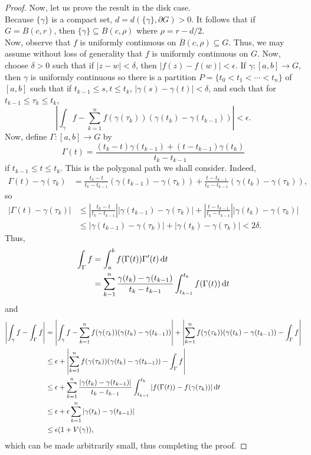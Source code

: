 \begin{proof}
		Now, let us prove the result in the disk case.\\
		Because $\{\gamma\}$ is a compact set, $d = d(\{\gamma\},\partial G) > 0$. It follows that if $G = B(c,r)$, then $\{\gamma\} \subseteq B(c,\rho)$ where $\rho = r - d/2$.\\
		Now, observe that $f$ is uniformly continuous on $\overline{B}(c,\rho) \subseteq G$. Thus, we may assume without loss of generality that $f$ is uniformly continuous on $G$. Now, choose $\delta > 0$ such that if $|z-w| < \delta$, then $|f(z) - f(w)| < \epsilon$. If $\gamma : [a,b] \to G$, then $\gamma$ is uniformly continuous so there is a partition $P = \{t_0 < t_1 < \cdots < t_n\}$ of $[a,b]$ such that if $t_{k-1} \le s,t \le t_k$, $|\gamma(s) - \gamma(t)| < \delta$, and such that for $t_{k-1} \le \tau_k \le t_k$,
		\[ \left| \int_\gamma f - \sum_{k=1}^n f(\gamma(\tau_k)) (\gamma(t_k) - \gamma(t_{k-1})) \right| < \epsilon. \]
		Now, define $\Gamma : [a,b] \to G$ by
		\[ \Gamma(t) = \frac{(t_k - t) \gamma(t_{k-1}) + (t - t_{k-1}) \gamma(t_k)}{t_k - t_{k-1}} \]
		if $t_{k-1} \le t \le t_k$. This is the polygonal path we shall consider. Indeed,
		\begin{align*}
			\Gamma(t) - \gamma(\tau_k) &= \frac{t_k - t}{t_k - t_{k-1}} (\gamma(t_{k-1}) - \gamma(\tau_k)) + \frac{t - t_{k-1}}{t_k - t_{k-1}} (\gamma(t_k) - \gamma(\tau_k)),
		\end{align*}
		so
		\begin{align*}
			|\Gamma(t) - \gamma(\tau_k)| &\le \left| \frac{t_k - t}{t_k - t_{k-1}} \right| \left| \gamma(t_{k-1}) - \gamma(\tau_k) \right| + \left| \frac{t - t_{k-1}}{t_k - t_{k-1}} \right| \left| \gamma(t_k) - \gamma(\tau_k) \right| \\
				&\le \left| \gamma(t_{k-1}) - \gamma(\tau_k) \right| + \left| \gamma(t_k) - \gamma(\tau_k) \right| < 2\delta.
		\end{align*}
		Thus,
		\begin{align*}
			\int_\Gamma f &= \int_a^b f(\Gamma(t)) \Gamma'(t) \dif t \\
				&= \sum_{k-1}^n \frac{\gamma(t_k) - \gamma(t_{k-1})}{t_k - t_{k-1}} \int_{t_{k-1}}^{t_k} f(\Gamma(t)) \dif t
		\end{align*}
		and
		\begin{align*}
			\left| \int_\gamma f - \int_\Gamma f \right| &= \left| \int_\gamma f - \sum_{k=1}^n f(\gamma(\tau_k)) (\gamma(t_k) - \gamma(t_{k-1})) \right| + \left| \sum_{k=1}^n f(\gamma(\tau_k)) (\gamma(t_k) - \gamma(t_{k-1})) - \int_\Gamma f \right| \\
				&\le \epsilon + \left| \sum_{k=1}^n f(\gamma(\tau_k)) (\gamma(t_k) - \gamma(t_{k-1})) - \int_\Gamma f \right| \\
				&\le \epsilon + \sum_{k=1}^n \frac{|\gamma(t_k) - \gamma(t_{k-1})|}{t_k - t_{k-1}} \int_{t_{k-1}}^{t_k} |f(\Gamma(t)) - f(\gamma(\tau_k))| \dif t \\
				&\le \epsilon + \epsilon \sum_{k=1}^n |\gamma(t_k) - \gamma(t_{k-1})| \\
				&\le \epsilon (1 + V(\gamma)),
		\end{align*}
		which can be made arbitrarily small, thus completing the proof.
	\end{proof}

